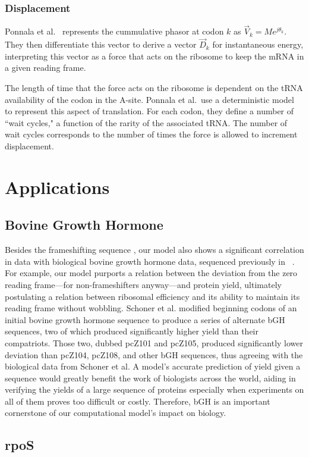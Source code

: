 \documentclass{article}
\begin{document}
\subsubsection{Displacement}

Ponnala et al.~\cite{lalit:embs} represents the cummulative phasor at codon $k$ as $\vec{V}_k = Me^{j\theta_k}$.  
They then differentiate this vector to derive a vector $\vec{D}_k$ for instantaneous energy, interpreting this
vector as a force that acts on the ribosome to keep the mRNA in a given reading frame.

The length of time that the force acts on the ribosome is dependent on the tRNA availability of the codon in the A-site.
Ponnala et al.\ use a deterministic model to represent this aspect of translation.  For each codon, they define a number
of ``wait cycles," a function of the rarity of the associated tRNA.  The number of wait cycles corresponds to the number
of times the force is allowed to increment displacement.

\section{Applications}

\subsection{Bovine Growth Hormone}
Besides the frameshifting sequence \prfB, our model also shows a significant correlation in data with biological
bovine growth hormone data, sequenced previously in \ecoli~\cite{schoner:bgh}. For example, our model purports a relation
between the deviation from the zero reading frame---for non-frameshifters anyway---and protein yield, ultimately postulating
a relation between ribosomal efficiency and its ability to maintain its reading frame without wobbling. Schoner et al.
modified beginning codons of an initial bovine growth hormone sequence to produce a series of alternate bGH sequences,
two of which produced significantly higher yield than their compatriots. Those two, dubbed pcZ101 and pcZ105, produced significantly
lower deviation than pcZ104, pcZ108, and other bGH sequences, thus agreeing with the biological data from Schoner et al.
A model's accurate prediction of yield given a sequence would greatly benefit the work of biologists across the world,
aiding in verifying the yields of a large sequence of proteins especially when experiments on all of them proves too difficult
or costly. Therefore, bGH is an important cornerstone of our computational model's impact on biology.

\subsection{rpoS}


\end{document}
